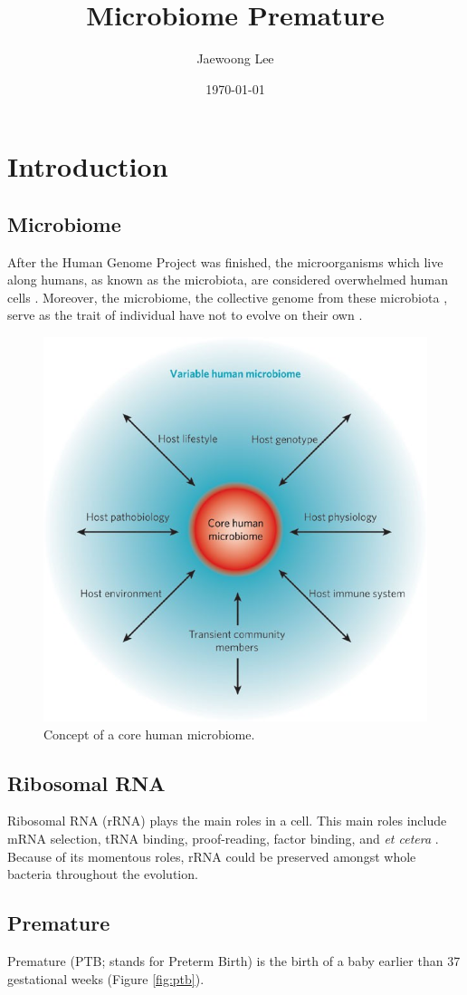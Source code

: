 \documentclass[a4paper]{article}
\title{Microbiome Premature}
\author{Jaewoong Lee}
\date{\today}
\begin{document}
   	\maketitle
    \newpage

    \tableofcontents
    \listoftables
    \listoffigures
    \newpage

    \section{Introduction}
        \subsection{Microbiome}
            After the Human Genome Project was finished, the microorganisms which live along humans, as known as the microbiota, are considered overwhelmed human cells \cite{micro1}. Moreover, the microbiome, the collective genome from these microbiota \cite{micro2}, serve as the trait of individual have not to evolve on their own \cite{micro1}.

            \begin{figure}[p]
                \centering
                \includegraphics[width=0.4 \linewidth]{figures/microbiome.jpg}
                \caption{Concept of a core human microbiome. \protect \cite{micro1}}
            \end{figure}

        \subsection[rRNA]{Ribosomal RNA}
            Ribosomal RNA (rRNA) plays the main roles in a cell. This main roles include mRNA selection, tRNA binding, proof-reading, factor binding, and \textit{et cetera} \cite{rrna2}. Because of its momentous roles, rRNA could be preserved amongst whole bacteria throughout the evolution.

        \subsection{Premature}
            Premature (PTB; stands for Preterm Birth) is the birth of a baby earlier than 37 gestational weeks (Figure \ref{fig:ptb}).
\end{document}
